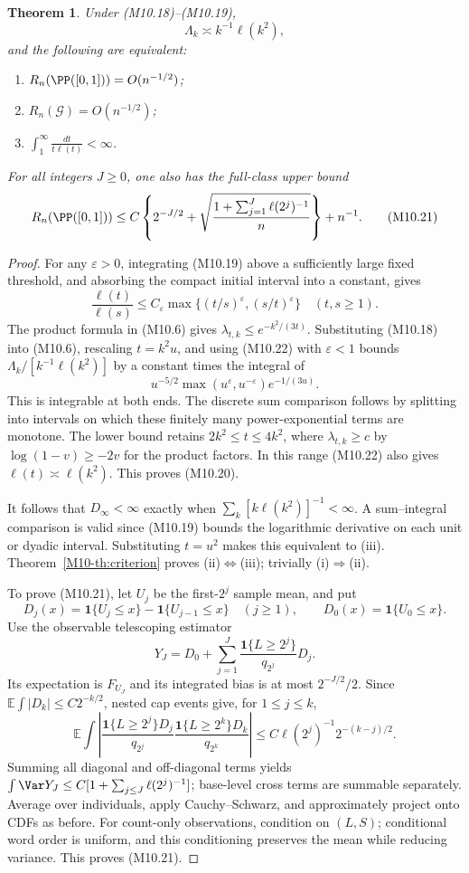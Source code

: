 \documentclass[11pt,a4paper]{article}
\newtheorem{theorem}{Theorem}[section]
\theoremstyle{definition}\newtheorem{definition}[theorem]{Definition}
\theoremstyle{remark}\newtheorem{remark}[theorem]{Remark}
\newcommand{\E}{\mathbb E}\newcommand{\one}{\mathbf 1}\newcommand{\1}{\mathbf 1}
\numberwithin{equation}{section}
\begin{document}
\begin{theorem}\label{M10-th:slow}
Under (M10.18)--(M10.19),
\[
 \Lambda_k\asymp k^{-1}\ell(k^2),\tag{M10.20}
\]
and the following are equivalent:
\begin{enumerate}[label=(\roman*)]
\item $R_n(\PP([0,1]))=O(n^{-1/2})$;
\item $R_n(\mathcal G)=O(n^{-1/2})$;
\item $\displaystyle\int_1^\infty\frac{dt}{t\ell(t)}<\infty$.
\end{enumerate}
For all integers $J\ge0$, one also has the full-class upper bound
\[
 R_n(\PP([0,1]))\le C\left\{2^{-J/2}
 +\sqrt{\frac{1+\sum_{j=1}^J\ell(2^j)^{-1}}n}\right\}+n^{-1}.
\tag{M10.21}
\]
\end{theorem}
\begin{proof}
For any $\varepsilon>0$, integrating (M10.19) above a sufficiently large fixed threshold, and absorbing the compact initial interval into a constant, gives
\[
 \frac{\ell(t)}{\ell(s)}\le C_\varepsilon
       \max\{(t/s)^\varepsilon,(s/t)^\varepsilon\}\quad(t,s\ge1).\tag{M10.22}
\]
The product formula in (M10.6) gives $\lambda_{t,k}\le e^{-k^2/(3t)}$. Substituting (M10.18) into (M10.6), rescaling $t=k^2u$, and using (M10.22) with $\varepsilon<1$ bounds $\Lambda_k/[k^{-1}\ell(k^2)]$ by a constant times the integral of
\[
 u^{-5/2}\max(u^\varepsilon,u^{-\varepsilon})e^{-1/(3u)}.
\]
This is integrable at both ends. The discrete sum comparison follows by splitting into intervals on which these finitely many power-exponential terms are monotone. The lower bound retains $2k^2\le t\le4k^2$, where $\lambda_{t,k}\ge c$ by $\log(1-v)\ge-2v$ for the product factors. In this range (M10.22) also gives $\ell(t)\asymp\ell(k^2)$. This proves (M10.20).

It follows that $D_\infty<\infty$ exactly when $\sum_k[k\ell(k^2)]^{-1}<\infty$. A sum--integral comparison is valid since (M10.19) bounds the logarithmic derivative on each unit or dyadic interval. Substituting $t=u^2$ makes this equivalent to (iii). Theorem~\ref{M10-th:criterion} proves (ii)$\Leftrightarrow$(iii); trivially (i)$\Rightarrow$(ii).

To prove (M10.21), let $U_j$ be the first-$2^j$ sample mean, and put
\[
 D_j(x)=\1\{U_j\le x\}-\1\{U_{j-1}\le x\}\quad(j\ge1),\qquad
 D_0(x)=\1\{U_0\le x\}.
\]
Use the observable telescoping estimator
\[
 Y_J=D_0+\sum_{j=1}^J\frac{\1\{L\ge2^j\}}{q_{2^j}}D_j.
\]
Its expectation is $F_{U_J}$ and its integrated bias is at most $2^{-J/2}/2$. Since $\E\int|D_k|\le C2^{-k/2}$, nested cap events give, for $1\le j\le k$,
\[
 \E\int\left|\frac{\1\{L\ge2^j\}D_j}{q_{2^j}}
                \frac{\1\{L\ge2^k\}D_k}{q_{2^k}}\right|
 \le C\ell(2^j)^{-1}2^{-(k-j)/2}.\tag{M10.23}
\]
Summing all diagonal and off-diagonal terms yields
$\int\Var Y_J\le C[1+\sum_{j\le J}\ell(2^j)^{-1}]$; base-level cross terms are summable separately. Average over individuals, apply Cauchy--Schwarz, and approximately project onto CDFs as before. For count-only observations, condition on $(L,S)$; conditional word order is uniform, and this conditioning preserves the mean while reducing variance. This proves (M10.21).


\end{proof}
\end{document}
